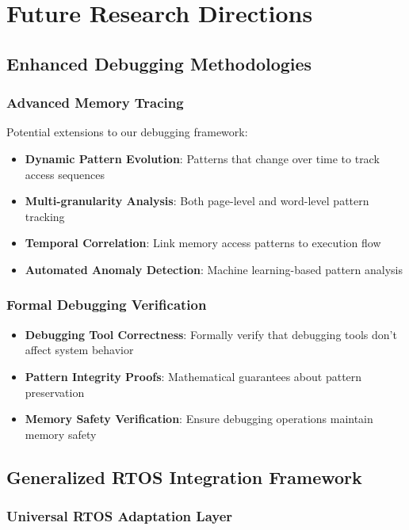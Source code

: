\documentclass[11pt,a4paper]{article}
\begin{document}
\section{Future Research Directions}

\subsection{Enhanced Debugging Methodologies}

\subsubsection{Advanced Memory Tracing}

Potential extensions to our debugging framework:

\begin{itemize}
    \item \textbf{Dynamic Pattern Evolution}: Patterns that change over time to track access sequences
    \item \textbf{Multi-granularity Analysis}: Both page-level and word-level pattern tracking
    \item \textbf{Temporal Correlation}: Link memory access patterns to execution flow
    \item \textbf{Automated Anomaly Detection}: Machine learning-based pattern analysis
\end{itemize}

\subsubsection{Formal Debugging Verification}

\begin{itemize}
    \item \textbf{Debugging Tool Correctness}: Formally verify that debugging tools don't affect system behavior
    \item \textbf{Pattern Integrity Proofs}: Mathematical guarantees about pattern preservation
    \item \textbf{Memory Safety Verification}: Ensure debugging operations maintain memory safety
\end{itemize}

\subsection{Generalized RTOS Integration Framework}

\subsubsection{Universal RTOS Adaptation Layer}
\end{document}
